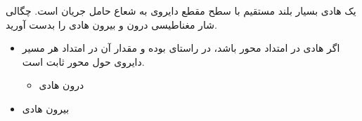 
\begin{ELexample}{}

یک هادی بسیار بلند مستقیم با سطح مقطع دایروی به شعاع  حامل جریان  است. چگالی شار مغناطیسی درون و بیرون هادی را بدست آورید.


\begin{ELsolution}

\begin{itemize}
\tightlist
\item
  اگر هادی در امتداد محور  باشد،  در راستای \ELim{\phi} بوده و مقدار آن در امتداد هر مسیر دایروی حول محور  ثابت است.

  \begin{itemize}
  \tightlist
  \item
    درون هادی
  \end{itemize}
\end{itemize}


\begin{itemize}
\tightlist
\item
  بیرون هادی
\end{itemize}


\end{ELsolution}

\end{ELexample}



